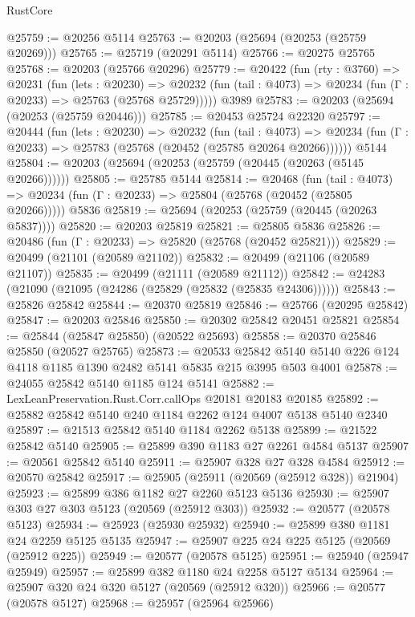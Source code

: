 \begin{lexlean}{RustCore}
\begin{coremodule}
@25759 := @20256 @5114
@25763 := @20203 (@25694 (@20253 (@25759 @20269)))
@25765 := @25719 (@20291 @5114)
@25766 := @20275 @25765
@25768 := @20203 (@25766 @20296)
@25779 := @20422
    (fun (rty : @3760) =>
    @20231
      (fun (lets : @20230) =>
      @20232 (fun (tail : @4073) => @20234 (fun (Γ : @20233) => @25763 (@25768 @25729)))))
    @3989
@25783 := @20203 (@25694 (@20253 (@25759 @20446)))
@25785 := @20453 @25724 @22320
@25797 := @20444
    (fun (lets : @20230) =>
    @20232
      (fun (tail : @4073) =>
      @20234 (fun (Γ : @20233) => @25783 (@25768 (@20452 (@25785 @20264 @20266))))))
    @5144
@25804 := @20203 (@25694 (@20253 (@25759 (@20445 (@20263 (@5145 @20266))))))
@25805 := @25785 @5144
@25814 := @20468
    (fun (tail : @4073) => @20234 (fun (Γ : @20233) => @25804 (@25768 (@20452 (@25805 @20266)))))
    @5836
@25819 := @25694 (@20253 (@25759 (@20445 (@20263 @5837))))
@25820 := @20203 @25819
@25821 := @25805 @5836
@25826 := @20486 (fun (Γ : @20233) => @25820 (@25768 (@20452 @25821)))
@25829 := @20499 (@21101 (@20589 @21102))
@25832 := @20499 (@21106 (@20589 @21107))
@25835 := @20499 (@21111 (@20589 @21112))
@25842 := @24283 (@21090 (@21095 (@24286 (@25829 (@25832 (@25835 @24306))))))
@25843 := @25826 @25842
@25844 := @20370 @25819
@25846 := @25766 (@20295 @25842)
@25847 := @20203 @25846
@25850 := @20302 @25842 @20451 @25821
@25854 := @25844 (@25847 @25850) (@20522 @25693)
@25858 := @20370 @25846 @25850 (@20527 @25765)
@25873 := @20533
    @25842
    @5140
    @5140
    @226
    @124
    @4118
    @1185
    @1390
    @2482
    @5141
    @5835
    @215
    @3995
    @503
    @4001
@25878 := @24055 @25842 @5140 @1185 @124 @5141
@25882 := LexLeanPreservation.Rust.Corr.callOps @20181 @20183 @20185
@25892 := @25882 @25842 @5140 @240 @1184 @2262 @124 @4007 @5138 @5140 @2340
@25897 := @21513 @25842 @5140 @1184 @2262 @5138
@25899 := @21522 @25842 @5140
@25905 := @25899 @390 @1183 @27 @2261 @4584 @5137
@25907 := @20561 @25842 @5140
@25911 := @25907 @328 @27 @328 @4584
@25912 := @20570 @25842
@25917 := @25905 (@25911 (@20569 (@25912 @328)) @21904)
@25923 := @25899 @386 @1182 @27 @2260 @5123 @5136
@25930 := @25907 @303 @27 @303 @5123 (@20569 (@25912 @303))
@25932 := @20577 (@20578 @5123)
@25934 := @25923 (@25930 @25932)
@25940 := @25899 @380 @1181 @24 @2259 @5125 @5135
@25947 := @25907 @225 @24 @225 @5125 (@20569 (@25912 @225))
@25949 := @20577 (@20578 @5125)
@25951 := @25940 (@25947 @25949)
@25957 := @25899 @382 @1180 @24 @2258 @5127 @5134
@25964 := @25907 @320 @24 @320 @5127 (@20569 (@25912 @320))
@25966 := @20577 (@20578 @5127)
@25968 := @25957 (@25964 @25966)

\end{coremodule}
\end{lexlean}
